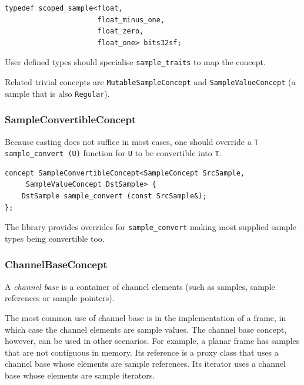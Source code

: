 \begin{lstlisting}
typedef scoped_sample<float,
                      float_minus_one,
                      float_zero,
                      float_one> bits32sf;
\end{lstlisting}

User defined types should specialise \texttt{sample\-\_traits} to map
the concept.

Related trivial concepts are \texttt{MutableSampleConcept} and
\texttt{SampleValue\-Concept} (a sample that is also
\texttt{Regular}).

\subsubsection{{SampleConvertibleConcept}}

Because casting does not suffice in most cases, one should
override a \texttt{T sample\_convert (U)} function for \texttt{U} to
be convertible into \texttt{T}.

\begin{lstlisting}
concept SampleConvertibleConcept<SampleConcept SrcSample,
     SampleValueConcept DstSample> {
    DstSample sample_convert (const SrcSample&);
};
\end{lstlisting}

The library provides overrides for \texttt{sample\_convert} making
most supplied sample types being convertible too.

\subsubsection{{ChannelBaseConcept}}

A \emph{channel base} is a container of channel
elements (such as samples, sample references or sample pointers).

The most common use of channel base is in the implementation of a
frame, in which case the channel elements are sample values. The
channel base concept, however, can be used in other scenarios. For
example, a planar frame has samples that are not contiguous in
memory. Its reference is a proxy class that uses a channel base whose
elements are sample references. Its iterator uses a channel base whose
elements are sample iterators.

